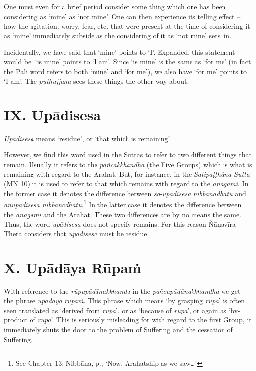 One must even for a brief period consider some thing which one has been considering as `mine' as `not mine'. One can then experience its telling effect -- how the agitation, worry, fear, etc. that were present at the time of considering it as `mine' immediately subside as the considering of it as `not mine' sets~in.

Incidentally, we have said that `mine' points to `I'. Expanded, this statement would be: `is mine' points to `I am'. Since `is mine' is the same as `for me' (in fact the Pali word  refers to both `mine' and `for me'), we also have `for me' points to `I am'. The \emph{puthujjana} sees these things the other way about.

\section{IX. Upādisesa}

\emph{Upādisesa} means `residue', or `that which is remaining'.

However, we find this word used in the Suttas to refer to two different things that remain. Usually it refers to the \emph{pañcakkhandha} (the Five Groups) which is what is remaining with regard to the Arahat. But, for instance, in the \emph{Satipaṭṭhāna Sutta} (\href{https://suttacentral.net/mn10/en/sujato}{MN 10}) it is used to refer to that which remains with regard to the \emph{anāgāmi}. In the former case it denotes the difference between \emph{sa-upādisesa nibbānadhātu} and \emph{anupādisesa nibbānadhātu}.\footnote{See Chapter 13: Nibbāna, p.\pageref{ch-13-remainder}, `Now, Arahatship as we saw\ldots{}'} In the latter case it denotes the difference between the \emph{anāgāmi} and the Arahat. These two differences are by no means the same. Thus, the word \emph{upādisesa} does not specify  remains. For this reason Ñāṇavīra Thera considers that \emph{upādisesa} must be  residue.

\section{X. Upādāya Rūpaṁ}

With reference to the \emph{rūpupādānakkhanda} in the \emph{pañcupādānakkhandha} we get the phrase \emph{upādāya rūpaṁ}. This phrase which means `by grasping \emph{rūpa}' is often seen translated as `derived from \emph{rūpa}', or as `because of \emph{rūpa}', or again as `by-product of \emph{rūpa}'. This is seriously misleading for with regard to the first Group, it immediately shuts the door to the problem of Suffering and the cessation of Suffering.

